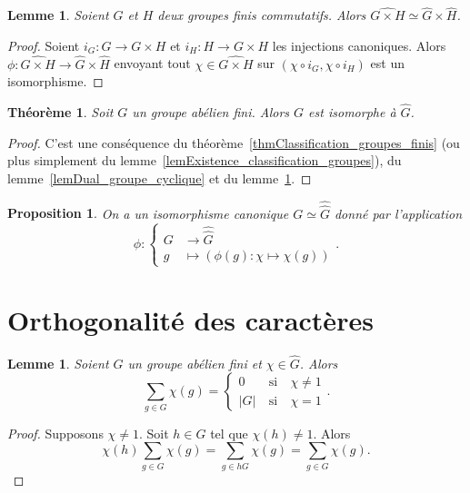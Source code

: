 \documentclass[a4paper]{article}
\theoremstyle{definition} %
\theoremstyle{plain} %
\newtheorem{Prop}[Def]{Proposition} %
\newtheorem{Lem}[Def]{Lemme} %
\newtheorem{Thm}[Def]{Théorème} %
\theoremstyle{remark} %
\newcommand{\wg}{\widehat{G}}
\begin{document}
\begin{Lem}\label{lemDual_produit_groupes}
Soient $G$ et $H$ deux groupes finis commutatifs. Alors $\widehat{G\times H}\simeq \widehat{G}\times \widehat{H}$.
\end{Lem}

\begin{proof}
Soient $i_G:G\rightarrow G\times H$ et $i_H:H\rightarrow G\times H$ les injections canoniques. Alors $\phi:\widehat{G\times H}\rightarrow \widehat{G}\times \widehat{H}$ envoyant tout $\chi\in \widehat{G\times H}$ sur $(\chi\circ i_G,\chi\circ i_H)$ est un isomorphisme. 
\end{proof}

\begin{Thm}
Soit $G$ un groupe abélien fini. Alors $G$ est isomorphe à $\widehat{G}$.
\end{Thm}

\begin{proof}
C'est une conséquence du théorème~\ref{thmClassification_groupes_finis} (ou plus simplement du lemme~\ref{lemExistence_classification_groupes}), du lemme~\ref{lemDual_groupe_cyclique} et du lemme~\ref{lemDual_produit_groupes}.
\end{proof}

\begin{Prop}
On a un isomorphisme canonique $G\simeq \widehat{\widehat{G}}$ donné par l'application  
\[\phi: \left\{\begin{aligned} G & \rightarrow  \widehat{\wg}\\ g & \mapsto (\phi(g):\chi\mapsto \chi(g))\end{aligned}\right. .\]
\end{Prop}


\section{Orthogonalité des caractères}

\begin{Lem}\label{lemOrthogonalité_caractères}
Soient $G$ un groupe abélien fini et $\chi\in \widehat{G}$. Alors \[\sum_{g\in G}\chi(g)=\left\{\begin{aligned} 0& \mathrm{\ si\ }& \chi\neq 1\\ |G| & \mathrm{\ si\ }&\chi=1\end{aligned}\right. .\]
\end{Lem}

\begin{proof}
Supposons $\chi\neq 1$. Soit $h\in G$ tel que $\chi(h)\neq 1$. Alors \[\chi(h)\sum_{g\in G} \chi(g)=\sum_{g\in hG}\chi(g)=\sum_{g\in G} \chi(g).\]
\end{proof}
\end{document}
